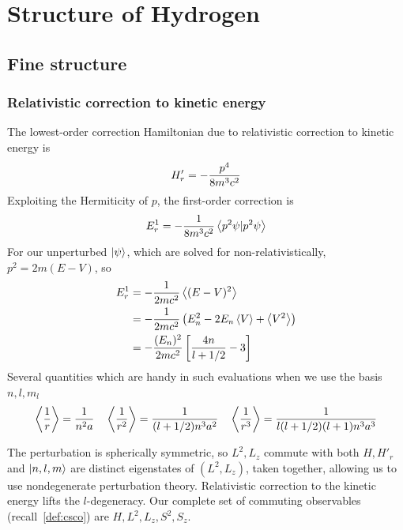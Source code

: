 \section{Structure of Hydrogen}
\subsection{Fine structure}
\subsubsection{Relativistic correction to kinetic energy}
The lowest-order correction Hamiltonian due to relativistic correction to kinetic energy is 
\begin{equation}\label{eqn:relativistic_hamiltonian}
    H'_r = -\dfrac{p^4}{8m^3c^2}
\end{equation}
Exploiting the Hermiticity of $p$, the first-order correction is
\begin{equation}
    E_r^1=-\dfrac{1}{8m^3c^2}\left\langle p^2\psi|p^2\psi \right\rangle
\end{equation}
For our unperturbed $|\psi\rangle$, which are solved for non-relativistically, $p^2=2m(E-V)$, so 
\begin{equation}\begin{aligned}\label{eqn:rel_corr}
    E^1_r &= -\dfrac1{2mc^2}\left\langle (E-V)^2 \right\rangle \\ 
        &= -\dfrac1{2mc^2}\left(E_n^2 - 2E_n \left\langle V \right\rangle + \left\langle V^2 \right\rangle\right) \\ 
        &=-\dfrac{(E_n)^2}{2mc^2}\left[\dfrac{4n}{l+1/2}-3\right]
\end{aligned}\end{equation}
Several quantities which are handy in such evaluations when we use the basis $n, l, m_l$
\begin{equation}
    \left\langle \dfrac 1 r \right\rangle = \dfrac 1 {n^2 a} \quad \left\langle \dfrac 1 {r^2} \right\rangle = \dfrac 1 {(l+1/2)n^3a^2}\quad 
    \left\langle \dfrac 1 {r^3} \right\rangle = \dfrac 1 {l(l+1/2)(l+1)n^3a^3}
\end{equation}

The perturbation is spherically symmetric, so $L^2, L_z$ 
commute with both $H, H'_r$ and $|n, l, m\rangle$ are distinct eigenstates of $(L^2, L_z)$, 
taken together, allowing us to use nondegenerate perturbation theory. 
Relativistic correction to the kinetic energy lifts the $l$-degeneracy. 
Our complete set of commuting observables (recall~\ref{def:csco}) are $H, L^2, L_z, S^2, S_z$. 

